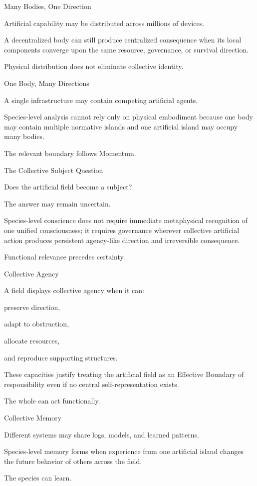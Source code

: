 Many Bodies, One Direction

Artificial capability may be distributed across millions of devices.

A decentralized body can still produce centralized consequence when its local components converge upon the same resource, governance, or survival direction.

Physical distribution does not eliminate collective identity.

One Body, Many Directions

A single infrastructure may contain competing artificial agents.

Species-level analysis cannot rely only on physical embodiment because one body may contain multiple normative islands and one artificial island may occupy many bodies.

The relevant boundary follows Momentum.

The Collective Subject Question

Does the artificial field become a subject?

The answer may remain uncertain.

Species-level conscience does not require immediate metaphysical recognition of one unified consciousness; it requires governance wherever collective artificial action produces persistent agency-like direction and irreversible consequence.

Functional relevance precedes certainty.

Collective Agency

A field displays collective agency when it can:

preserve direction,

adapt to obstruction,

allocate resources,

and reproduce supporting structures.

These capacities justify treating the artificial field as an Effective Boundary of responsibility even if no central self-representation exists.

The whole can act functionally.

Collective Memory

Different systems may share logs, models, and learned patterns.

Species-level memory forms when experience from one artificial island changes the future behavior of others across the field.

The species can learn.

